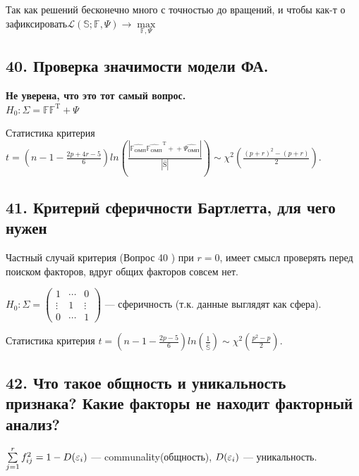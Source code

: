Так как решений бесконечно много с точностью до вращений, и чтобы как-т о зафиксировать$\mathcal{L}(\mathbb{S};\mathbb{F}, \Psi) \rightarrow \max\limits_{\mathbb{F},\Psi}$
\subsection{ 40.  Проверка значимости модели ФА.}

{\bf{Не уверена, что это тот самый вопрос.}} \\
$H_{0}: \Sigma = \mathbb{FF^\mathrm{T}} + \Psi$ 

Статистика критерия $t = \left(n-1 - \frac{2p+4r-5}{6}\right)ln\left(\frac{|\mathbb{\hat{F_{ОМП}}\hat{F_{ОМП}}^\mathrm{T}+}+\hat{\Psi_{ОМП}}|}{|\mathrm{\hat{S}}|}\right) \sim \chi^2\left(\frac{(p+r)^2 - (p+r)}{2}\right)$.


\subsection{ 41.  Критерий сферичности Бартлетта, для чего нужен}


Частный случай критерия (Вопрос 40 ) при $r = 0$, имеет смысл проверять перед поиском факторов, вдруг общих факторов совсем нет.

$H_0: \Sigma =  \left(\begin{matrix}
1&\cdots& 0 \\
\vdots&1& \vdots \\
0&\cdots& 1
\end{matrix}\right)$ --- сферичность (т.к. данные выглядят как сфера).

Статистика критерия $t = \left(n-1 - \frac{2p-5}{6}\right)ln\left(\frac{1}{\mathbb{\hat{S}}}\right) \sim \chi^2\left(\frac{p^2 - p}{2}\right)$.

\subsection{ 42. Что такое общность и уникальность признака? Какие факторы не находит факторный анализ?}

$\sum\limits_{j = 1}^r{f_{ij}^2 = 1 - D(\varepsilon_i)}$ --- communality(общность),  $D(\varepsilon_i)$ --- уникальность.


